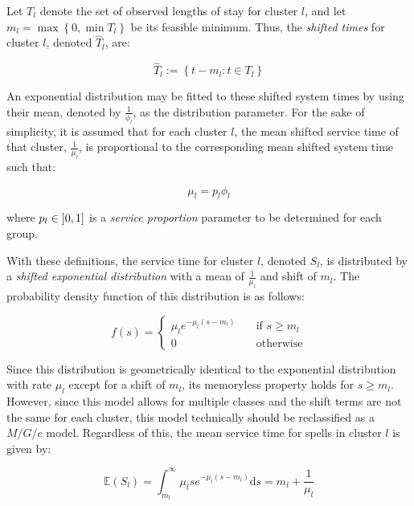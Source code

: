 Let \(T_l\) denote the set of observed lengths of stay for cluster \(l\), and
let \(m_l = \max \left\{0, \min T_l\right\}\) be its feasible minimum. Thus, the
\emph{shifted times} for cluster \(l\), denoted \(\widehat T_l\), are:

\begin{equation}\label{eq:shifted}
    \widehat T_l := \left\{t - m_l : t \in T_l\right\}
\end{equation}

An exponential distribution may be fitted to these shifted system times by
using their mean, denoted by \(\frac{1}{\phi_l}\), as the distribution
parameter. For the sake of simplicity, it is assumed that for each cluster
\(l\), the mean shifted service time of that cluster, \(\frac{1}{\mu_l}\), is
proportional to the corresponding mean shifted system time such that:

\begin{equation}\label{eq:shifted_services}
    \mu_l = p_l \phi_l
\end{equation}

\noindent where \(p_l \in \interval[open left]{0}{1}\) is a {\slshape service
proportion} parameter to be determined for each group.

With these definitions, the service time for cluster \(l\), denoted \(S_l\), is
distributed by a {\slshape shifted exponential distribution} with a mean of
\(\frac{1}{\mu_l}\) and shift of \(m_l\). The probability density function
of this distribution is as follows:

\begin{equation}\label{eq:shifted_pdf}
    f(s) = \begin{cases}
        \mu_l e^{-\mu_l (s - m_l)} & \quad \text{if \(s \ge m_l\)}\\
        0 & \quad \text{otherwise}
    \end{cases}
\end{equation}

Since this distribution is geometrically identical to the exponential
distribution with rate \(\mu_l\) except for a shift of \(m_l\), its memoryless
property holds for \(s \ge m_l\). However, since this model allows for multiple
classes and the shift terms are not the same for each cluster, this model
technically should be reclassified as a \(M/G/c\) model. Regardless of this, the
mean service time for spells in cluster \(l\) is given by:

\begin{equation}\label{eq:services}
    \mathbb E \left(S_l\right)
    = \int_{m_l}^{\infty} \mu_l s e^{-\mu_l (s - m_l)} \mathrm ds
    = m_l + \frac{1}{\mu_l}
\end{equation}

